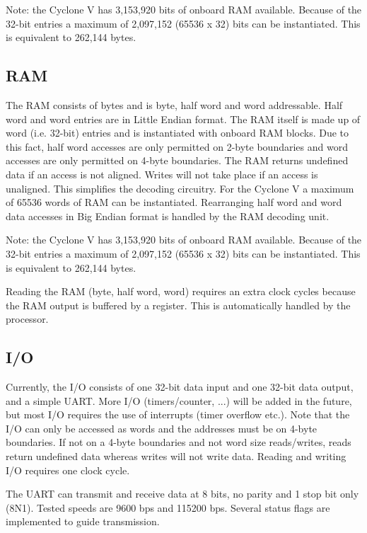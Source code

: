 \documentclass[12pt]{article}
\begin{document}
Note: the Cyclone V has 3,153,920 bits of onboard RAM available. Because of the 32-bit entries a maximum of 2,097,152 (65536 x 32) bits can be instantiated. This is equivalent to 262,144 bytes.

\subsection{RAM}
\label{sec:ram}
The RAM consists of bytes and is byte, half word and word addressable. Half word and word entries are in Little Endian format. The RAM itself is made up of word (i.e. 32-bit) entries and is instantiated with onboard RAM blocks. Due to this fact, half word accesses are only permitted on 2-byte boundaries and word accesses are only permitted on 4-byte boundaries. The RAM returns undefined data if an access is not aligned. Writes will not take place if an access is unaligned. This simplifies the decoding circuitry. For the Cyclone V a maximum of 65536 words of RAM can be instantiated. Rearranging half word and word data accesses in Big Endian format is handled by the RAM decoding unit.

Note: the Cyclone V has 3,153,920 bits of onboard RAM available. Because of the 32-bit entries a maximum of 2,097,152 (65536 x 32) bits can be instantiated. This is equivalent to 262,144 bytes.

Reading the RAM (byte, half word, word) requires an extra clock cycles because the RAM output is buffered by a register. This is automatically handled by the processor.

\subsection{I/O}
\label{sec/io}
Currently, the I/O consists of one 32-bit data input and one 32-bit data output, and a simple UART. More I/O (timers/counter, ...) will be added in the future, but most I/O requires the use of interrupts (timer overflow etc.). Note that the I/O can only be accessed as words and the addresses must be on 4-byte boundaries. If not on a 4-byte boundaries and not word size reads/writes, reads return undefined data whereas writes will not write data. Reading and writing I/O requires one clock cycle.

The UART can transmit and receive data at 8 bits, no parity and 1 stop bit only (8N1). Tested speeds are 9600 bps and 115200 bps. Several status flags are implemented to guide transmission.
\end{document}
